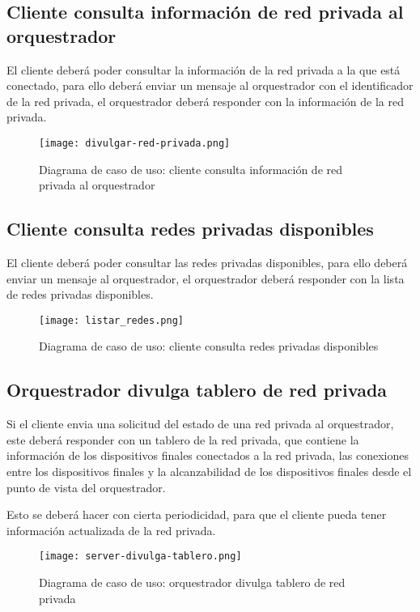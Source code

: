 \subsection{Cliente consulta información de red privada al orquestrador}
El cliente deberá poder consultar la información de la red privada a la que está conectado, para ello deberá enviar un mensaje al orquestrador con el identificador de la red privada, el orquestrador deberá responder con la información de la red privada.

\begin{figure}[h!]
    \centering
    \texttt{[image: divulgar-red-privada.png]}
    \caption{Diagrama de caso de uso: cliente consulta información de red privada al orquestrador}
\end{figure}


\subsection{Cliente consulta redes privadas disponibles}
El cliente deberá poder consultar las redes privadas disponibles, para ello deberá enviar un mensaje al orquestrador, el orquestrador deberá responder con la lista de redes privadas disponibles.

\begin{figure}[h!]
    \centering
    \texttt{[image: listar\_redes.png]}
    \caption{Diagrama de caso de uso: cliente consulta redes privadas disponibles}
\end{figure}

\subsection{Orquestrador divulga tablero de red privada}
Si el cliente envia una solicitud del estado de una red privada al orquestrador, este deberá responder con un tablero de la red privada, que contiene la información de los dispositivos finales conectados a la red privada, las conexiones entre los dispositivos finales y la alcanzabilidad de los dispositivos finales desde el punto de vista del orquestrador.

Esto se deberá hacer con cierta periodicidad, para que el cliente pueda tener información actualizada de la red privada.

\begin{figure}[h!]
    \centering
    \texttt{[image: server-divulga-tablero.png]}
    \caption{Diagrama de caso de uso: orquestrador divulga tablero de red privada}
\end{figure}

